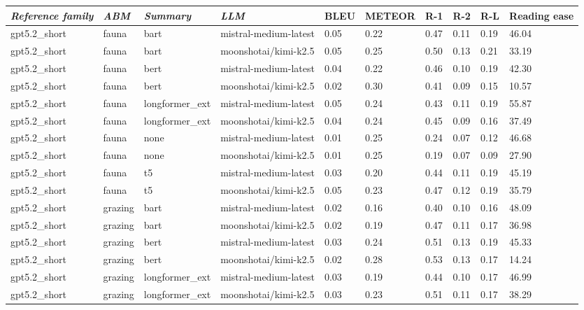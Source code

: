 \begin{tabular}{|l|l|l|l|l|l|l|l|l|l|}
\hline
\textit{\textbf{Reference family}} & \textit{\textbf{ABM}} & \textit{\textbf{Summary}} & \textit{\textbf{LLM}} & BLEU & METEOR & R-1 & R-2 & R-L & Reading ease \\
 \hline
 gpt5.2\_short & fauna & bart & mistral-medium-latest & 0.05 & 0.22 & 0.47 & 0.11 & 0.19 & 46.04 \\
 \hline
 gpt5.2\_short & fauna & bart & moonshotai/kimi-k2.5 & 0.05 & 0.25 & 0.50 & 0.13 & 0.21 & 33.19 \\
 \hline
 gpt5.2\_short & fauna & bert & mistral-medium-latest & 0.04 & 0.22 & 0.46 & 0.10 & 0.19 & 42.30 \\
 \hline
 gpt5.2\_short & fauna & bert & moonshotai/kimi-k2.5 & 0.02 & 0.30 & 0.41 & 0.09 & 0.15 & 10.57 \\
 \hline
 gpt5.2\_short & fauna & longformer\_ext & mistral-medium-latest & 0.05 & 0.24 & 0.43 & 0.11 & 0.19 & 55.87 \\
 \hline
 gpt5.2\_short & fauna & longformer\_ext & moonshotai/kimi-k2.5 & 0.04 & 0.24 & 0.45 & 0.09 & 0.16 & 37.49 \\
 \hline
 gpt5.2\_short & fauna & none & mistral-medium-latest & 0.01 & 0.25 & 0.24 & 0.07 & 0.12 & 46.68 \\
 \hline
 gpt5.2\_short & fauna & none & moonshotai/kimi-k2.5 & 0.01 & 0.25 & 0.19 & 0.07 & 0.09 & 27.90 \\
 \hline
 gpt5.2\_short & fauna & t5 & mistral-medium-latest & 0.03 & 0.20 & 0.44 & 0.11 & 0.19 & 45.19 \\
 \hline
 gpt5.2\_short & fauna & t5 & moonshotai/kimi-k2.5 & 0.05 & 0.23 & 0.47 & 0.12 & 0.19 & 35.79 \\
 \hline
 gpt5.2\_short & grazing & bart & mistral-medium-latest & 0.02 & 0.16 & 0.40 & 0.10 & 0.16 & 48.09 \\
 \hline
 gpt5.2\_short & grazing & bart & moonshotai/kimi-k2.5 & 0.02 & 0.19 & 0.47 & 0.11 & 0.17 & 36.98 \\
 \hline
 gpt5.2\_short & grazing & bert & mistral-medium-latest & 0.03 & 0.24 & 0.51 & 0.13 & 0.19 & 45.33 \\
 \hline
 gpt5.2\_short & grazing & bert & moonshotai/kimi-k2.5 & 0.02 & 0.28 & 0.53 & 0.13 & 0.17 & 14.24 \\
 \hline
 gpt5.2\_short & grazing & longformer\_ext & mistral-medium-latest & 0.03 & 0.19 & 0.44 & 0.10 & 0.17 & 46.99 \\
 \hline
 gpt5.2\_short & grazing & longformer\_ext & moonshotai/kimi-k2.5 & 0.03 & 0.23 & 0.51 & 0.11 & 0.17 & 38.29 \\

\end{tabular}
